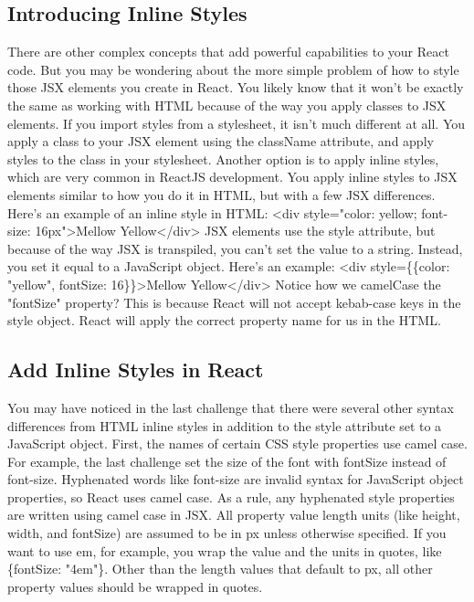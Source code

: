 \documentclass{article}%
\begin{document}
\subsection{Introducing Inline Styles}%
\label{subsec:IntroducingInlineStyles}%
There are other complex concepts that add powerful capabilities to your React code. But you may be wondering about the more simple problem of how to style those JSX elements you create in React. You likely know that it won't be exactly the same as working with HTML because of  the way you apply classes to JSX elements.\newline%
If you import styles from a stylesheet, it isn't much different at all. You apply a class to your JSX element using the className attribute, and apply styles to the class in your stylesheet. Another option is to apply inline styles, which are very common in ReactJS development.\newline%
You apply inline styles to JSX elements similar to how you do it in HTML, but with a few JSX differences. Here's an example of an inline style in HTML:\newline%
<div style="color: yellow; font{-}size: 16px">Mellow Yellow</div>\newline%
JSX elements use the style attribute, but because of the way JSX is transpiled, you can't set the value to a string. Instead, you set it equal to a JavaScript object. Here's an example:\newline%
<div style=\{\{color: "yellow", fontSize: 16\}\}>Mellow Yellow</div>\newline%
Notice how we camelCase the "fontSize" property? This is because React will not accept kebab{-}case keys in the style object. React will apply the correct property name for us in the HTML.\newline%

%
\subsection{Add Inline Styles in React}%
\label{subsec:AddInlineStylesinReact}%
You may have noticed in the last challenge that there were several other syntax differences from HTML inline styles in addition to the style attribute set to a JavaScript object. First, the names of certain CSS style properties use camel case. For example, the last challenge set the size of the font with fontSize instead of font{-}size. Hyphenated words like font{-}size are invalid syntax for JavaScript object properties, so React uses camel case. As a rule, any hyphenated style properties are written using camel case in JSX.\newline%
All property value length units (like height, width, and fontSize) are assumed to be in px unless otherwise specified. If you want to use em, for example, you wrap the value and the units in quotes, like \{fontSize: "4em"\}. Other than the length values that default to px, all other property values should be wrapped in quotes.\newline%
\end{document}
